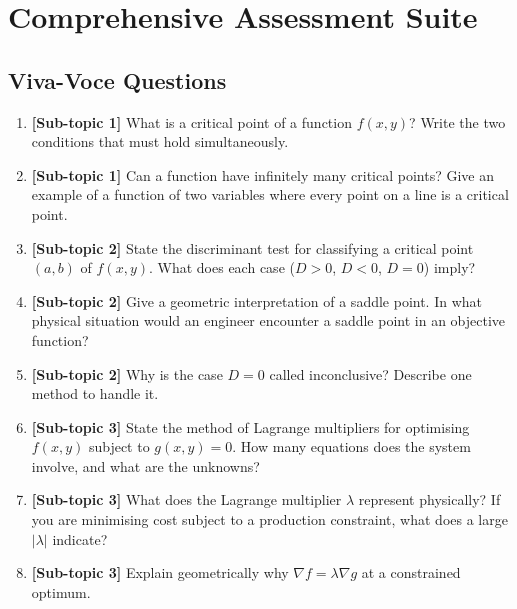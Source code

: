 \documentclass[12pt,a4paper]{article}
\begin{document}
\section{Comprehensive Assessment Suite}

\subsection*{Viva-Voce Questions}

\begin{enumerate}

  \item \textbf{[Sub-topic 1]} What is a critical point of a function $f(x,y)$? Write the two conditions that must hold simultaneously.

  \item \textbf{[Sub-topic 1]} Can a function have infinitely many critical points? Give an example of a function of two variables where every point on a line is a critical point.

  \item \textbf{[Sub-topic 2]} State the discriminant test for classifying a critical point $(a,b)$ of $f(x,y)$. What does each case ($D>0$, $D<0$, $D=0$) imply?

  \item \textbf{[Sub-topic 2]} Give a geometric interpretation of a saddle point. In what physical situation would an engineer encounter a saddle point in an objective function?

  \item \textbf{[Sub-topic 2]} Why is the case $D = 0$ called inconclusive? Describe one method to handle it.

  \item \textbf{[Sub-topic 3]} State the method of Lagrange multipliers for optimising $f(x,y)$ subject to $g(x,y) = 0$. How many equations does the system involve, and what are the unknowns?

  \item \textbf{[Sub-topic 3]} What does the Lagrange multiplier $\lambda$ represent physically? If you are minimising cost subject to a production constraint, what does a large $|\lambda|$ indicate?

  \item \textbf{[Sub-topic 3]} Explain geometrically why $\nabla f = \lambda \nabla g$ at a constrained optimum.

\end{enumerate}
\end{document}
